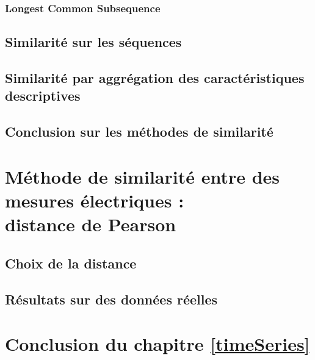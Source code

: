 	\subsubsection{Longest Common Subsequence}
		
%		
%		
	
\subsection{Similarit\'e sur les s\'equences}
	
\subsection{Similarit\'e par aggr\'egation des caract\'eristiques descriptives}
	
\subsection{Conclusion sur les m\'ethodes de similarit\'e}
	

\section{M\'ethode de similarit\'e entre des mesures \'electriques : \\ distance de Pearson}
	\subsection{Choix de la distance}
		
%		
	\subsection{R\'esultats sur des donn\'ees r\'eelles}
		
\section{Conclusion du chapitre \ref{timeSeries}}
			

